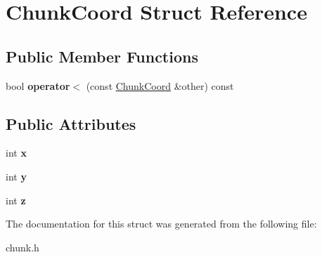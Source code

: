 \hypertarget{structChunkCoord}{\section{\-Chunk\-Coord \-Struct \-Reference}
\label{structChunkCoord}
}
\subsection*{\-Public \-Member \-Functions}
\begin{DoxyCompactItemize}
\item 
\hypertarget{structChunkCoord_aff7009253580e68330cf95c9467a6c58}{bool {\bfseries operator$<$} (const \hyperlink{structChunkCoord}{\-Chunk\-Coord} \&other) const }\label{structChunkCoord_aff7009253580e68330cf95c9467a6c58}

\end{DoxyCompactItemize}
\subsection*{\-Public \-Attributes}
\begin{DoxyCompactItemize}
\item 
\hypertarget{structChunkCoord_acfafebe94c4a2679f0781e70690e412b}{int {\bfseries x}}\label{structChunkCoord_acfafebe94c4a2679f0781e70690e412b}

\item 
\hypertarget{structChunkCoord_a9b618a411177df2a9e0f2b059184495e}{int {\bfseries y}}\label{structChunkCoord_a9b618a411177df2a9e0f2b059184495e}

\item 
\hypertarget{structChunkCoord_ac4d9ca409f8eee8253a77affba02f630}{int {\bfseries z}}\label{structChunkCoord_ac4d9ca409f8eee8253a77affba02f630}

\end{DoxyCompactItemize}


\-The documentation for this struct was generated from the following file\-:\begin{DoxyCompactItemize}
\item 
chunk.\-h\end{DoxyCompactItemize}
